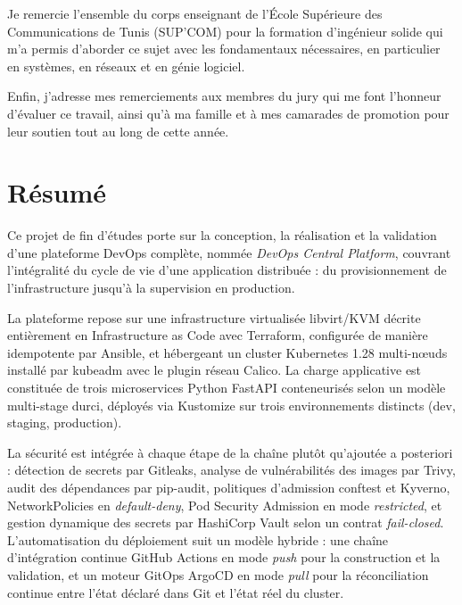 \documentclass[12pt,a4paper,twoside,openright]{report}
\makeatletter
\def\cleardoublepage{\clearpage\if@twoside
  \ifodd\c@page\else\hbox{}\thispagestyle{empty}\newpage\fi\fi}
\newcommand{\ecole}{École Supérieure des Communications de Tunis (SUP'COM)}
\makeatother
\begin{document}
Je remercie l'ensemble du corps enseignant de l'\ecole{} pour la formation
d'ingénieur solide qui m'a permis d'aborder ce sujet avec les fondamentaux
nécessaires, en particulier en systèmes, en réseaux et en génie logiciel.

Enfin, j'adresse mes remerciements aux membres du jury qui me font l'honneur
d'évaluer ce travail, ainsi qu'à ma famille et à mes camarades de promotion
pour leur soutien tout au long de cette année.

\cleardoublepage

\chapter*{Résumé}

Ce projet de fin d'études porte sur la conception, la réalisation et la validation
d'une plateforme DevOps complète, nommée \emph{DevOps Central Platform}, couvrant
l'intégralité du cycle de vie d'une application distribuée : du provisionnement de
l'infrastructure jusqu'à la supervision en production.

La plateforme repose sur une infrastructure virtualisée libvirt/KVM décrite entièrement
en Infrastructure as Code avec Terraform, configurée de manière idempotente par Ansible,
et hébergeant un cluster Kubernetes 1.28 multi-n\oe uds installé par kubeadm avec le
plugin réseau Calico. La charge applicative est constituée de trois microservices
Python FastAPI conteneurisés selon un modèle multi-stage durci, déployés via Kustomize
sur trois environnements distincts (dev, staging, production).

La sécurité est intégrée à chaque étape de la chaîne plutôt qu'ajoutée a posteriori :
détection de secrets par Gitleaks, analyse de vulnérabilités des images par Trivy,
audit des dépendances par pip-audit, politiques d'admission conftest et Kyverno,
NetworkPolicies en \emph{default-deny}, Pod Security Admission en mode \emph{restricted},
et gestion dynamique des secrets par HashiCorp Vault selon un contrat \emph{fail-closed}.
L'automatisation du déploiement suit un modèle hybride : une chaîne d'intégration
continue GitHub Actions en mode \emph{push} pour la construction et la validation, et
un moteur GitOps ArgoCD en mode \emph{pull} pour la réconciliation continue entre l'état
déclaré dans Git et l'état réel du cluster.
\end{document}
